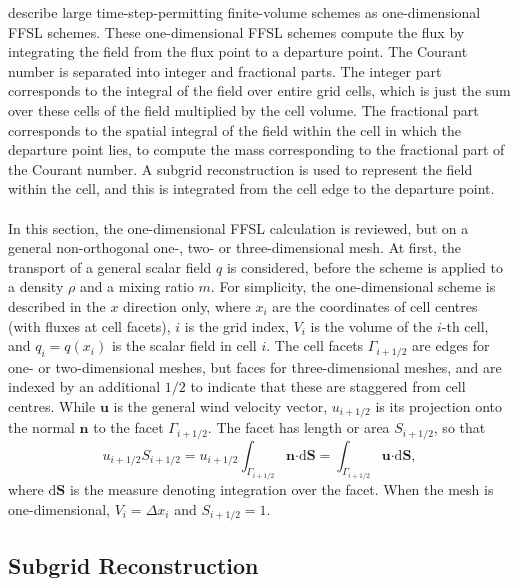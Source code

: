 \documentclass[11pt,a4paper]{article}
\begin{document}
\citet{lin1996ffsl} describe large time-step-permitting finite-volume schemes as one-dimensional FFSL schemes. These one-dimensional FFSL schemes compute the flux by integrating the field from the flux point to a departure point. The Courant number is separated into integer and fractional parts. The integer part corresponds to the integral of the field over entire grid cells, which is just the sum over these cells of the field multiplied by the cell volume. The fractional part corresponds to the spatial integral of the field within the cell in which the departure point lies, to compute the mass corresponding to the fractional part of the Courant number. A subgrid reconstruction is used to represent the field within the cell, and this is integrated from the cell edge to the departure point. \\
\\
In this section, the one-dimensional FFSL calculation is reviewed, but on a general non-orthogonal one-, two- or three-dimensional mesh.
At first, the transport of a general scalar field $q$ is considered, before the scheme is applied to a density $\rho$ and a mixing ratio $m$.
For simplicity, the one-dimensional scheme is described in the $x$ direction only, where $x_i$ are the coordinates of cell centres (with fluxes at cell facets), $i$ is the grid index, $V_i$ is the volume of the $i$-th cell, and $q_i=q(x_i)$ is the scalar field in cell $i$.
The cell facets $\varGamma_{i+1/2}$ are edges for one- or two-dimensional meshes, but faces for three-dimensional meshes, and are indexed by an additional $1/2$ to indicate that these are staggered from cell centres.
While $\bm{u}$ is the general wind velocity vector, $u_{i+1/2}$ is its projection onto the normal $\bm{n}$ to the facet $\varGamma_{i+1/2}$.
The facet has length or area $S_{i+1/2}$, so that
\begin{equation} \label{eqn:u_normal}
u_{i+1/2} S_{i+1/2} =
u_{i+1/2} \int_{\varGamma_{i+1/2}} \bm{n} \bm{\cdot} \mathrm{d}\bm{S} = \int_{\varGamma_{i+1/2}} \bm{u} \bm{\cdot} \mathrm{d}\bm{S},
\end{equation}
where $\mathrm{d}\bm{S}$ is the measure denoting integration over the facet.
When the mesh is one-dimensional, $V_i=\Delta x_i$ and $S_{i+1/2}=1$.

\subsection{Subgrid Reconstruction}
\end{document}
